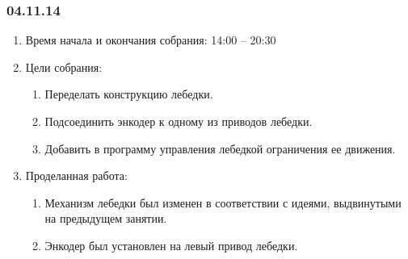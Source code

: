 
\subsubsection{04.11.14}

\begin{enumerate}
	\item Время начала и окончания собрания:
	14:00 – 20:30
	\item Цели собрания:
	\begin{enumerate}
	  \item	Переделать конструкцию лебедки.
	  
	  \item	Подсоединить энкодер к одному из приводов лебедки.
	  
	  \item	Добавить в программу управления лебедкой ограничения ее движения.
	  
    \end{enumerate}
    
	\item Проделанная работа:
	\begin{enumerate}
	  \item	Механизм лебедки был изменен в соответствии с идеями, выдвинутыми на предыдущем занятии.
      
      \item	Энкодер был установлен на левый привод лебедки.
      

\end{enumerate}
\end{enumerate}
